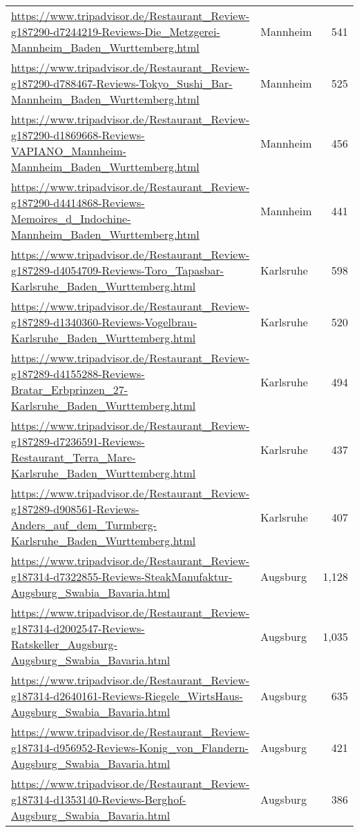 \begin{table}[H]
{\begin{tabular}{llr}
\url{https://www.tripadvisor.de/Restaurant\_Review-g187290-d7244219-Reviews-Die\_Metzgerei-Mannheim\_Baden\_Wurttemberg.html} & Mannheim & 541 \\ 
\url{https://www.tripadvisor.de/Restaurant\_Review-g187290-d788467-Reviews-Tokyo\_Sushi\_Bar-Mannheim\_Baden\_Wurttemberg.html} & Mannheim & 525 \\ 
\url{https://www.tripadvisor.de/Restaurant\_Review-g187290-d1869668-Reviews-VAPIANO\_Mannheim-Mannheim\_Baden\_Wurttemberg.html} & Mannheim & 456 \\ 
\url{https://www.tripadvisor.de/Restaurant\_Review-g187290-d4414868-Reviews-Memoires\_d\_Indochine-Mannheim\_Baden\_Wurttemberg.html} & Mannheim & 441 \\ 
\url{https://www.tripadvisor.de/Restaurant\_Review-g187289-d4054709-Reviews-Toro\_Tapasbar-Karlsruhe\_Baden\_Wurttemberg.html} & Karlsruhe & 598 \\ 
\url{https://www.tripadvisor.de/Restaurant\_Review-g187289-d1340360-Reviews-Vogelbrau-Karlsruhe\_Baden\_Wurttemberg.html} & Karlsruhe & 520 \\ 
\url{https://www.tripadvisor.de/Restaurant\_Review-g187289-d4155288-Reviews-Bratar\_Erbprinzen\_27-Karlsruhe\_Baden\_Wurttemberg.html} & Karlsruhe & 494 \\ 
\url{https://www.tripadvisor.de/Restaurant\_Review-g187289-d7236591-Reviews-Restaurant\_Terra\_Mare-Karlsruhe\_Baden\_Wurttemberg.html} & Karlsruhe & 437 \\ 
\url{https://www.tripadvisor.de/Restaurant\_Review-g187289-d908561-Reviews-Anders\_auf\_dem\_Turmberg-Karlsruhe\_Baden\_Wurttemberg.html} & Karlsruhe & 407 \\ 
\url{https://www.tripadvisor.de/Restaurant\_Review-g187314-d7322855-Reviews-SteakManufaktur-Augsburg\_Swabia\_Bavaria.html} & Augsburg & 1,128 \\ 
\url{https://www.tripadvisor.de/Restaurant\_Review-g187314-d2002547-Reviews-Ratskeller\_Augsburg-Augsburg\_Swabia\_Bavaria.html} & Augsburg & 1,035 \\ 
\url{https://www.tripadvisor.de/Restaurant\_Review-g187314-d2640161-Reviews-Riegele\_WirtsHaus-Augsburg\_Swabia\_Bavaria.html} & Augsburg & 635 \\ 
\url{https://www.tripadvisor.de/Restaurant\_Review-g187314-d956952-Reviews-Konig\_von\_Flandern-Augsburg\_Swabia\_Bavaria.html} & Augsburg & 421 \\ 
\url{https://www.tripadvisor.de/Restaurant\_Review-g187314-d1353140-Reviews-Berghof-Augsburg\_Swabia\_Bavaria.html} & Augsburg & 386 \\ 

\end{tabular}}
\end{table}
